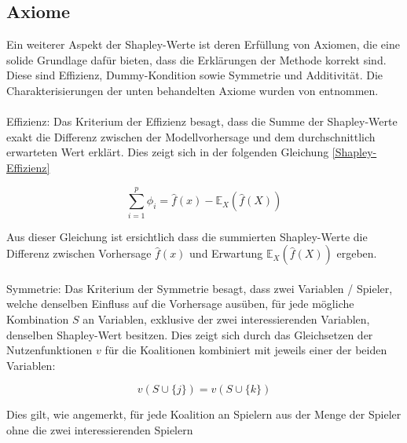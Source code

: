 \documentclass[12pt,titlepage,oneside]{book}
\begin{document}

\subsection{Axiome} \label{shapleyaxiom}
Ein weiterer Aspekt der Shapley-Werte ist deren Erfüllung von Axiomen, die eine solide Grundlage dafür bieten, dass die Erklärungen der Methode korrekt sind.\\
Diese sind Effizienz, Dummy-Kondition sowie Symmetrie und Additivität. Die Charakterisierungen der unten behandelten Axiome wurden von \cite{molnar2020interpretable} entnommen. \\ \\

Effizienz: Das Kriterium der Effizienz besagt, dass die Summe der Shapley-Werte exakt die Differenz zwischen der Modellvorhersage und dem durchschnittlich erwarteten Wert erklärt. Dies zeigt sich in der folgenden Gleichung \ref{Shapley-Effizienz}

\begin{equation} \label{Shapley-Effizienz}
\sum_{i=1}^p \phi_i = \hat{f}(x) - \mathbb{E}_X(\hat{f}(X))
\end{equation}

Aus dieser Gleichung ist ersichtlich dass die summierten Shapley-Werte die Differenz zwischen Vorhersage $\hat{f}(x)$ und Erwartung $\mathbb{E}_X(\hat{f}(X))$ ergeben.\\ \\

Symmetrie: Das Kriterium der Symmetrie besagt, dass zwei Variablen / Spieler, welche denselben Einfluss auf die Vorhersage ausüben, für jede mögliche Kombination $S$ an Variablen, exklusive der zwei interessierenden Variablen, denselben Shapley-Wert besitzen. Dies zeigt sich durch das Gleichsetzen der Nutzenfunktionen $v$ für die Koalitionen kombiniert mit jeweils einer der beiden Variablen:

\begin{equation}
v(S \cup \{j\}) = v(S \cup \{k\})
\end{equation}

Dies gilt, wie angemerkt, für jede Koalition an Spielern aus der Menge der Spieler ohne die zwei interessierenden Spielern
\end{document}
